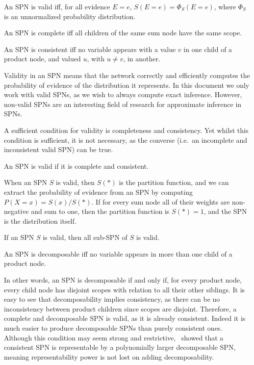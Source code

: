 \begin{definition}[Validity]
  An SPN is valid iff, for all evidence $E=e$, $S(E=e)=\Phi_S(E=e)$, where $\Phi_S$ is an
  unnormalized probability distribution.
\end{definition}

\begin{definition}[Completeness]
  An SPN is complete iff all children of the same sum node have the same scope.
\end{definition}

\begin{definition}[Consistency]
  An SPN is consistent iff no variable appears with a value $v$ in one child of a product node, and
  valued $u$, with $u\neq v$, in another.
\end{definition}

Validity in an SPN means that the network correctly and efficiently computes the probability of
evidence of the distribution it represents. In this document we only work with valid SPNs, as we
wish to always compute exact inference. However, non-valid SPNs are an interesting field of
research for approximate inference in SPNs.

A sufficient condition for validity is completeness and consistency. Yet whilst this condition is
sufficient, it is not necessary, as the converse (i.e.\ an incomplete and inconsistent valid SPN)
can be true.

\begin{theorem}
  An SPN is valid if it is complete and consistent.
\end{theorem}

When an SPN $S$ is valid, then $S(\ast)$ is the partition function, and we can extract the
probability of evidence from an SPN by computing $P(X=x)=S(x)/S(\ast)$. If for every sum node all
of their weights are non-negative and sum to one, then the partition function is $S(\ast)=1$, and
the SPN is the distribution itself.

\begin{corollary}
  If an SPN $S$ is valid, then all sub-SPN of $S$ is valid.
\end{corollary}

\begin{definition}[Decomposability]
  An SPN is decomposable iff no variable appears in more than one child of a product node.
\end{definition}

In other words, an SPN is decomposable if and only if, for every product node, every child node has
disjoint scopes with relation to all their other siblings. It is easy to see that decomposability
implies consistency, as there can be no inconsistency between product children since scopes are
disjoint. Therefore, a complete and decomposable SPN is valid, as it is already consistent. Indeed
it is much easier to produce decomposable SPNs than purely consistent ones. Although this condition
may seem strong and restrictive,~\cite{theoretical-spn} showed that a consistent SPN is
representable by a polynomially larger decomposable SPN, meaning representability power is not lost
on adding decomposability.


